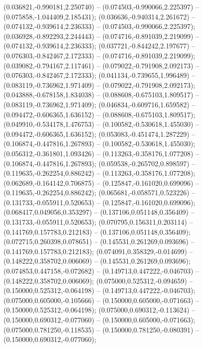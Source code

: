  (0.036821,-0.990181,2.250740) -- (0.074503,-0.990066,2.225397) -- (0.075858,-1.044409,2.185431);
 (0.036636,-0.940314,2.261672) -- (0.074132,-0.939614,2.236333) -- (0.074503,-0.990066,2.225397);
 (0.036928,-0.892293,2.244443) -- (0.074716,-0.891039,2.219099) -- (0.074132,-0.939614,2.236333);
 (0.037721,-0.844242,2.197677) -- (0.076303,-0.842467,2.172333) -- (0.074716,-0.891039,2.219099);
 (0.039082,-0.794167,2.117461) -- (0.079022,-0.791908,2.092173) -- (0.076303,-0.842467,2.172333);
 (0.041134,-0.739655,1.996489) -- (0.083119,-0.736962,1.971409) -- (0.079022,-0.791908,2.092173);
 (0.043888,-0.678158,1.834038) -- (0.088608,-0.675103,1.809517) -- (0.083119,-0.736962,1.971409);
 (0.046834,-0.609716,1.659582) -- (0.094472,-0.606365,1.636152) -- (0.088608,-0.675103,1.809517);
 (0.049910,-0.534178,1.476753) -- (0.100582,-0.530618,1.455030) -- (0.094472,-0.606365,1.636152);
 (0.053083,-0.451474,1.287229) -- (0.106874,-0.447816,1.267893) -- (0.100582,-0.530618,1.455030);
 (0.056312,-0.361801,1.093426) -- (0.113263,-0.358176,1.077208) -- (0.106874,-0.447816,1.267893);
 (0.059538,-0.265702,0.898597) -- (0.119635,-0.262254,0.886242) -- (0.113263,-0.358176,1.077208);
 (0.062689,-0.164142,0.706875) -- (0.125847,-0.161020,0.699096) -- (0.119635,-0.262254,0.886242);
 (0.065681,-0.058571,0.523226) -- (0.131733,-0.055911,0.520653) -- (0.125847,-0.161020,0.699096);
 (0.068417,0.049056,0.353297) -- (0.137106,0.051148,0.356409) -- (0.131733,-0.055911,0.520653);
 (0.070795,0.156311,0.203114) -- (0.141769,0.157783,0.212183) -- (0.137106,0.051148,0.356409);
 (0.072715,0.260398,0.078651) -- (0.145531,0.261269,0.093696) -- (0.141769,0.157783,0.212183);
 (0.074091,0.358329,-0.014699) -- (0.148222,0.358702,0.006069) -- (0.145531,0.261269,0.093696);
 (0.074853,0.447158,-0.072682) -- (0.149713,0.447222,-0.046703) -- (0.148222,0.358702,0.006069);
 (0.075000,0.525312,-0.094659) -- (0.150000,0.525312,-0.064198) -- (0.149713,0.447222,-0.046703);
 (0.075000,0.605000,-0.105666) -- (0.150000,0.605000,-0.071663) -- (0.150000,0.525312,-0.064198);
 (0.075000,0.690312,-0.113624) -- (0.150000,0.690312,-0.077060) -- (0.150000,0.605000,-0.071663);
 (0.075000,0.781250,-0.118535) -- (0.150000,0.781250,-0.080391) -- (0.150000,0.690312,-0.077060);
